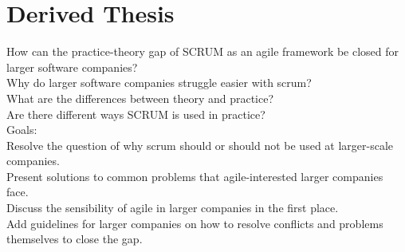 % 
\section*{Derived Thesis}

How can the practice-theory gap of SCRUM as an agile framework be closed for larger software companies? \\
Why do larger software companies struggle easier with scrum? \\
What are the differences between theory and practice? \\
Are there different ways SCRUM is used in practice? \\

Goals:\\
Resolve the question of why scrum should or should not be used at larger-scale companies.\\
Present solutions to common problems that agile-interested larger companies face.\\
Discuss the sensibility of agile in larger companies in the first place.\\
Add guidelines for larger companies on how to resolve conflicts and problems themselves to close the gap.
